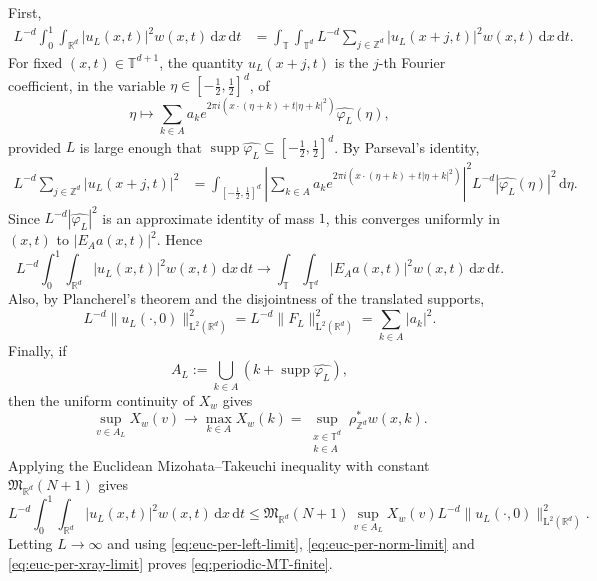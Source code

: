 \documentclass[11pt,reqno]{amsart}
\numberwithin{equation}{section}
\newcommand{\supp}{\operatorname{supp}}
\newcommand{\dd}{\,\mathrm{d}}
\renewcommand{\leq}{\leqslant}
\begin{document}
First,
\begin{align*}
L^{-d}\int_0^1\int_{\mathbb{R}^d}|u_L(x,t)|^2w(x,t)\dd x\dd t
&=\int_{\mathbb{T}}\int_{\mathbb{T}^d}L^{-d}\sum_{j\in\mathbb{Z}^d}|u_L(x+j,t)|^2w(x,t)\dd x\dd t.
\end{align*}
For fixed $(x,t)\in\mathbb{T}^{d+1}$, the quantity $u_L(x+j,t)$ is the $j$-th Fourier coefficient, in the variable $\eta\in[-\tfrac12,\tfrac12]^d$, of
\[ \eta\mapsto \sum_{k\in A}a_k e^{2\pi i(x\cdot(\eta+k)+t|\eta+k|^2)}\widehat{\varphi_L}(\eta), \]
provided $L$ is large enough that $\supp\widehat{\varphi_L}\subseteq[-\tfrac12,\tfrac12]^d$. By Parseval's identity,
\begin{align*}
L^{-d}\sum_{j\in\mathbb{Z}^d}|u_L(x+j,t)|^2
&=\int_{[-\tfrac12,\tfrac12]^d}\left|\sum_{k\in A}a_k e^{2\pi i(x\cdot(\eta+k)+t|\eta+k|^2)}\right|^2L^{-d}|\widehat{\varphi_L}(\eta)|^2\dd\eta.
\end{align*}
Since $L^{-d}|\widehat{\varphi_L}|^2$ is an approximate identity of mass $1$, this converges uniformly in $(x,t)$ to $|E_Aa(x,t)|^2$. Hence
\begin{equation}\label{eq:euc-per-left-limit}
L^{-d}\int_0^1\int_{\mathbb{R}^d}|u_L(x,t)|^2w(x,t)\dd x\dd t
\longrightarrow
\int_{\mathbb{T}}\int_{\mathbb{T}^d}|E_Aa(x,t)|^2w(x,t)\dd x\dd t.
\end{equation}
Also, by Plancherel's theorem and the disjointness of the translated supports,
\begin{equation}\label{eq:euc-per-norm-limit}
L^{-d}\|u_L(\cdot,0)\|_{\mathrm{L}^2(\mathbb{R}^d)}^2
=L^{-d}\|F_L\|_{\mathrm{L}^2(\mathbb{R}^d)}^2
=\sum_{k\in A}|a_k|^2.
\end{equation}
Finally, if
\[ A_L:=\bigcup_{k\in A}(k+\supp\widehat{\varphi_L}), \]
then the uniform continuity of $X_w$ gives
\begin{equation}\label{eq:euc-per-xray-limit}
\sup_{v\in A_L}X_w(v)
\longrightarrow \max_{k\in A}X_w(k)
=\sup_{\substack{x\in\mathbb{T}^d\\ k\in A}}\rho^{\ast}_{\mathbb{Z}^d}w(x,k).
\end{equation}
Applying the Euclidean Mizohata--Takeuchi inequality with constant $\mathfrak{M}_{\mathbb{R}^d}(N+1)$ gives
\[ L^{-d}\int_0^1\int_{\mathbb{R}^d}|u_L(x,t)|^2w(x,t)\dd x\dd t
\leq \mathfrak{M}_{\mathbb{R}^d}(N+1)\sup_{v\in A_L}X_w(v)
L^{-d}\|u_L(\cdot,0)\|_{\mathrm{L}^2(\mathbb{R}^d)}^2. \]
Letting $L\to\infty$ and using \eqref{eq:euc-per-left-limit}, \eqref{eq:euc-per-norm-limit} and \eqref{eq:euc-per-xray-limit} proves \eqref{eq:periodic-MT-finite}.
\end{document}
